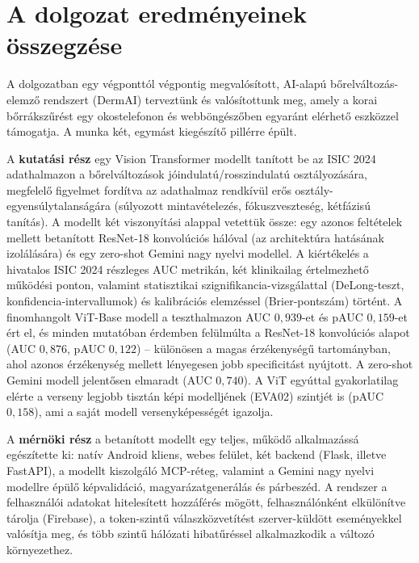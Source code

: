 
\section{A dolgozat eredményeinek összegzése}

A dolgozatban egy végponttól végpontig megvalósított, AI-alapú
bőrelváltozás-elemző rendszert (DermAI) terveztünk és valósítottunk meg, amely a
korai bőrrákszűrést egy okostelefonon és webböngészőben egyaránt elérhető
eszközzel támogatja. A munka két, egymást kiegészítő pillérre épült.

A \textbf{kutatási rész} egy Vision Transformer modellt tanított be az ISIC 2024
adathalmazon a bőrelváltozások jó\-indulatú/rosszindulatú osztályozására,
megfelelő figyelmet fordítva az adathalmaz rendkívül erős
osztály-egyensúlytalanságára (súlyozott mintavételezés, fókuszveszteség,
kétfázisú tanítás). A modellt két viszonyítási alappal vetettük össze: egy azonos
feltételek mellett betanított ResNet-18 konvolúciós hálóval (az architektúra
hatásának izolálására) és egy zero-shot Gemini nagy nyelvi modellel. A
kiértékelés a hivatalos ISIC 2024 részleges AUC metrikán, két klinikailag
értelmezhető működési ponton, valamint statisztikai szignifikancia-vizsgálattal
(DeLong-teszt, konfidencia-intervallumok) és kalibrációs elemzéssel (Brier-pontszám)
történt. A finomhangolt ViT-Base modell a teszthalmazon AUC $0{,}939$-et és pAUC
$0{,}159$-et ért el, és minden mutatóban érdemben felülmúlta a ResNet-18
konvolúciós alapot (AUC $0{,}876$, pAUC $0{,}122$) -- különösen a magas
érzékenységű tartományban, ahol azonos érzékenység mellett lényegesen jobb
specificitást nyújtott. A zero-shot Gemini modell jelentősen elmaradt (AUC
$0{,}740$). A ViT egyúttal gyakorlatilag elérte a verseny legjobb tisztán képi
modelljének (EVA02) szintjét is (pAUC $0{,}158$), ami a saját modell
versenyképességét igazolja.

A \textbf{mérnöki rész} a betanított modellt egy teljes, működő alkalmazássá
egészítette ki: natív Android kliens, webes felület, két backend (Flask, illetve
FastAPI), a modellt kiszolgáló MCP-réteg, valamint a Gemini nagy nyelvi modellre
épülő képvalidáció, magyarázatgenerálás és párbeszéd. A rendszer a felhasználói
adatokat hitelesített hozzáférés mögött, felhasználónként elkülönítve tárolja
(Firebase), a token-szintű válaszközvetítést szerver-küldött eseményekkel valósítja
meg, és több szintű hálózati hibatűréssel alkalmazkodik a változó környezethez.

